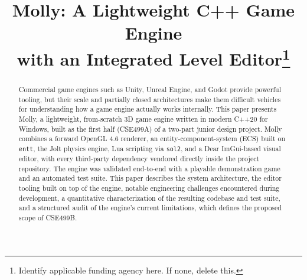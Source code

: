 \documentclass[conference]{IEEEtran}
\begin{document}
\title{Molly: A Lightweight C++ Game Engine \\ with an Integrated Level Editor\thanks{Identify applicable funding agency here. If none, delete this.}}

\author{
\and
{}
\and
{}
}

\maketitle

\begin{abstract}
Commercial game engines such as Unity, Unreal Engine, and Godot provide
powerful tooling, but their scale and partially closed architectures make
them difficult vehicles for understanding how a game engine actually
works internally. This paper presents Molly, a lightweight, from-scratch
3D game engine written in modern C++20 for Windows, built as the first
half (CSE499A) of a two-part junior design project. Molly combines a
forward OpenGL 4.6 renderer, an entity-component-system (ECS) built on
\texttt{entt}, the Jolt physics engine, Lua scripting via
\texttt{sol2}, and a Dear ImGui-based visual editor, with every
third-party dependency vendored directly inside the project repository.
The engine was validated end-to-end with a playable demonstration game
and an automated test suite. This paper describes the system
architecture, the editor tooling built on top of the engine, notable
engineering challenges encountered during development, a quantitative
characterization of the resulting codebase and test suite, and a
structured audit of the engine's current limitations, which defines the
proposed scope of CSE499B.
\end{abstract}
\end{document}
